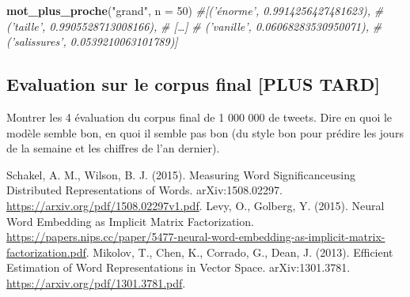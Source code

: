 \documentclass[11pt,french,french]{article}
\newenvironment{Shaded}{\begin{snugshade}}{\end{snugshade}}
\newcommand{\CommentTok}[1]{\textcolor[rgb]{0.56,0.35,0.01}{\textit{#1}}}
\newcommand{\DataTypeTok}[1]{\textcolor[rgb]{0.13,0.29,0.53}{#1}}
\newcommand{\DecValTok}[1]{\textcolor[rgb]{0.00,0.00,0.81}{#1}}
\newcommand{\KeywordTok}[1]{\textcolor[rgb]{0.13,0.29,0.53}{\textbf{#1}}}
\newcommand{\NormalTok}[1]{#1}
\newcommand{\StringTok}[1]{\textcolor[rgb]{0.31,0.60,0.02}{#1}}
\begin{document}
\footnotesize

\begin{Shaded}
\begin{Highlighting}[]
\KeywordTok{mot_plus_proche}\NormalTok{(}\StringTok{"grand"}\NormalTok{, }\DataTypeTok{n =} \DecValTok{50}\NormalTok{)}
\CommentTok{#[('énorme', 0.9914256427481623),}
\CommentTok{# ('taille', 0.9905528713008166),}
\CommentTok{# […]}
\CommentTok{# ('vanille', 0.06068283530950071),}
\CommentTok{# ('salissures', 0.0539210063101789)]}
\end{Highlighting}
\end{Shaded}

\normalsize

\hypertarget{evaluation-sur-le-corpus-final-plus-tard}{%
\subsection{Evaluation sur le corpus final {[}PLUS
TARD{]}}\label{evaluation-sur-le-corpus-final-plus-tard}}

Montrer les 4 évaluation du corpus final de 1 000 000 de tweets. Dire en
quoi le modèle semble bon, en quoi il semble pas bon (du style bon pour
prédire les jours de la semaine et les chiffres de l'an dernier).

\nocite{*}

\begin{thebibliography}{999}
 Schakel, A. M., Wilson, B. J. (2015). Measuring Word Significanceusing Distributed Representations of Words. arXiv:1508.02297. \url{https://arxiv.org/pdf/1508.02297v1.pdf}.
 Levy, O., Golberg, Y. (2015). Neural Word Embedding as Implicit Matrix Factorization.
\url{https://papers.nips.cc/paper/5477-neural-word-embedding-as-implicit-matrix-factorization.pdf}.
 Mikolov, T.,  Chen, K., Corrado, G., Dean, J. (2013). Efficient Estimation of Word Representations in Vector Space. arXiv:1301.3781. \url{https://arxiv.org/pdf/1301.3781.pdf}.
\end{thebibliography}
\end{document}
